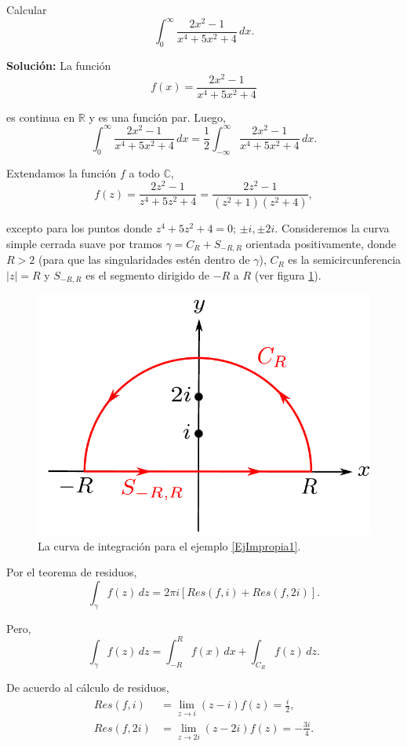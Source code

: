 \begin{ejemplo} \label{EjImpropia1}
Calcular 
$$\int_0^{\infty} \frac{2x^2-1}{x^4+5x^2+4} \,dx.$$

\textbf{Solución:} La función
$$f(x) =  \frac{2x^2-1}{x^4+5x^2+4}$$

es continua en $\mathbb{R}$ y es una función par. Luego,
$$\int_0^{\infty} \frac{2x^2-1}{x^4+5x^2+4} \,dx = \frac{1}{2} \int_{-\infty}^{\infty} \frac{2x^2-1}{x^4+5x^2+4} \,dx.$$

Extendamos la función $f$ a todo $\mathbb{C}$, 
$$f(z) = \frac{2z^2-1}{z^4+5z^2+4} = \frac{2z^2-1}{(z^2+1)(z^2+4)},$$

excepto para los puntos donde $z^4+5z^2+4 = 0$; $\pm i, \pm 2 i$. Consideremos la curva simple cerrada suave por tramos $\gamma = C_R + S_{-R,R}$ orientada positivamente, donde $R > 2$ (para que las singularidades estén dentro de $\gamma$), $C_R$ es la semicircunferencia $|z| = R$ y $S_{-R,R}$ es el segmento dirigido de $-R$ a $R$ (ver figura \ref{fig:IntegralImpropia1}).

\begin{figure}[H]
    \centering
    \includegraphics[scale = 0.6]{Figuras/IntegralImpropia1.pdf}
    \caption{La curva de integración para el ejemplo \ref{EjImpropia1}.}
    \label{fig:IntegralImpropia1}
\end{figure}

Por el teorema de residuos,
$$\int_{\gamma} f(z) \,dz = 2\pi i [Res(f,i) + Res(f,2i)].$$

Pero,
$$\int_{\gamma} f(z) \,dz = \int_{-R}^R f(x) \,dx + \int_{C_R}f(z)\,dz.$$

De acuerdo al cálculo de residuos,
\begin{align*}
    Res(f,i) &= \lim_{z\to i} (z-i)f(z) = \frac{i}{2}, \\
    Res(f,2i) &= \lim_{z\to 2i} (z-2i)f(z) = -\frac{3i}{4}.
\end{align*}


\end{ejemplo}
